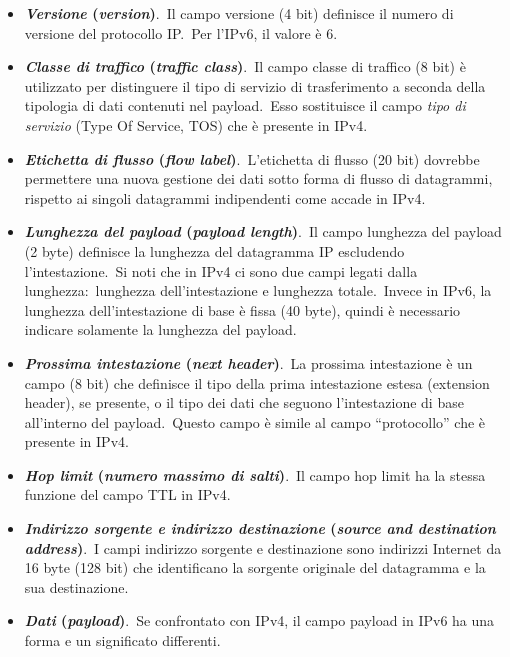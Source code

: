 \begin{itemize}
    \item \textbf{\emph{Versione} (\emph{version})}.\
          Il campo versione (4 bit) definisce il numero di versione del protocollo IP.\
          Per l'IPv6, il valore è 6.
    \item \textbf{\emph{Classe di traffico} (\emph{traffic class})}.\
          Il campo classe di traffico (8 bit) è utilizzato per distinguere il tipo di servizio di trasferimento a seconda della tipologia di dati contenuti nel payload.\
          Esso sostituisce il campo \emph{tipo di servizio} (Type Of Service, TOS) che è presente in IPv4.
    \item \textbf{\emph{Etichetta di flusso} (\emph{flow label})}.\
          L'etichetta di flusso (20 bit) dovrebbe permettere una nuova gestione dei dati sotto forma di flusso di datagrammi, rispetto ai singoli datagrammi indipendenti come accade in IPv4.
    \item \textbf{\emph{Lunghezza del payload} (\emph{payload length})}.\
          Il campo lunghezza del payload (2 byte) definisce la lunghezza del datagramma IP escludendo l'intestazione.\
          Si noti che in IPv4 ci sono due campi legati dalla lunghezza:\ lunghezza dell'intestazione e lunghezza totale.\
          Invece in IPv6, la lunghezza dell'intestazione di base è fissa (40 byte), quindi è necessario indicare solamente la lunghezza del payload.
    \item \textbf{\emph{Prossima intestazione} (\emph{next header})}.\
          La prossima intestazione è un campo (8 bit) che definisce il tipo della prima intestazione estesa (extension header), se presente, o il tipo dei dati che seguono l'intestazione di base all'interno del payload.\
          Questo campo è simile al campo ``protocollo'' che è presente in IPv4.
    \item \textbf{\emph{Hop limit} (\emph{numero massimo di salti})}.\
          Il campo hop limit ha la stessa funzione del campo TTL in IPv4.
    \item \textbf{\emph{Indirizzo sorgente e indirizzo destinazione} (\emph{source and destination address})}.\
          I campi indirizzo sorgente e destinazione sono indirizzi Internet da 16 byte (128 bit) che identificano la sorgente originale del datagramma e la sua destinazione.
    \item \textbf{\emph{Dati} (\emph{payload})}.\
          Se confrontato con IPv4, il campo payload in IPv6 ha una forma e un significato differenti.
\end{itemize}
